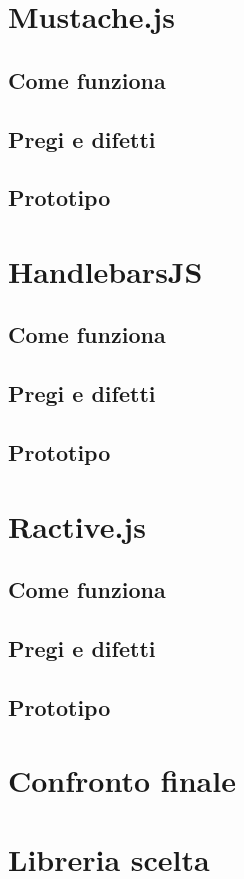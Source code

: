 \section{Mustache.js}

\subsection{Come funziona}

\subsection{Pregi e difetti}

\subsection{Prototipo}


\FloatBarrier
\section{HandlebarsJS}

\subsection{Come funziona}

\subsection{Pregi e difetti}

\subsection{Prototipo}


\FloatBarrier
\section{Ractive.js}

\subsection{Come funziona}

\subsection{Pregi e difetti}

\subsection{Prototipo}


\clearpage
\section{Confronto finale}

\FloatBarrier
\section{Libreria scelta}

